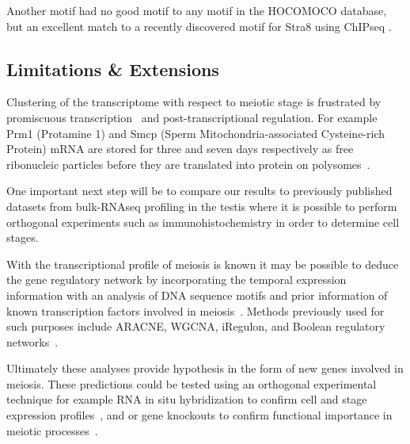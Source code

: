 Another motif had no good motif to any motif in the HOCOMOCO database, but an excellent match to a recently discovered motif for Stra8 using ChIPseq \parencite{Kojima2019Amplification}.




\subsection{Limitations \& Extensions}
Clustering of the transcriptome with respect to meiotic stage is frustrated by promiscuous transcription~\cite{Soumillon2013Cellular} and post-transcriptional regulation. For example Prm1 (Protamine 1) and Smcp (Sperm Mitochondria-associated Cysteine-rich Protein) mRNA are stored for three and seven days respectively as free ribonucleic particles before they are translated into protein on polysomes~\cite{Cullinane2015Mechanisms, Kleene1984Translational, Kleene2004Patterns}.



One important next step will be to compare our results to previously published datasets from bulk-RNAseq profiling in the testis where it is possible to perform orthogonal experiments such as immunohistochemistry in order to determine cell stages.


With the transcriptional profile of meiosis is known it may be possible to deduce the gene regulatory network by incorporating the temporal expression information with an analysis of DNA sequence motifs and prior information of known transcription factors involved in meiosis~\cite{Padovan-Merhar2013Using, Goutsias2007Computational}. Methods previously used for such purposes include ARACNE, WGCNA, iRegulon, and Boolean regulatory networks~\cite{Margolin2006Reverse, Zhang2005General, Janky2014iRegulon, Moignard2013Characterization}.

Ultimately these analyses provide hypothesis in the form of new genes involved in meiosis. These predictions could be tested using an orthogonal experimental technique for example RNA in situ hybridization to confirm cell and stage expression profiles~\cite{Moffitt2016Highperformance,Choi2016Mapping}, and or gene knockouts to confirm functional importance in meiotic processes~\cite{Jamsai2010Mouse}.
